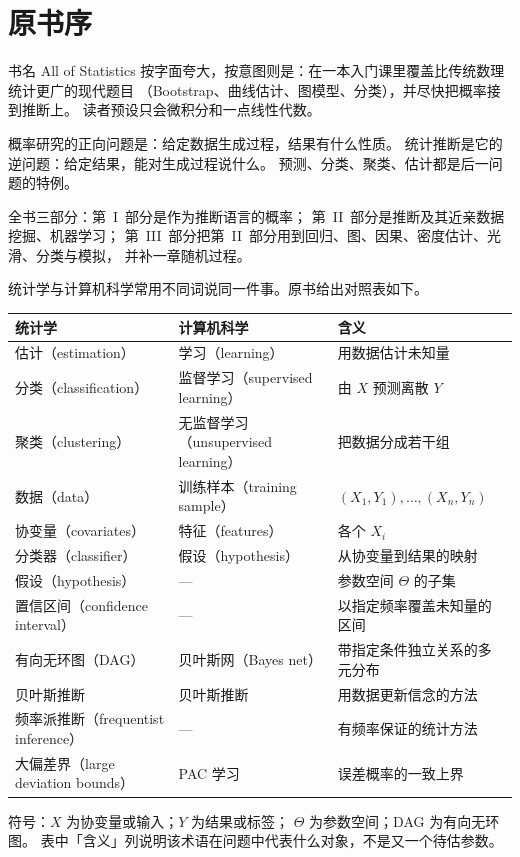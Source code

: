 \chapter*{原书序}

书名 All of Statistics 按字面夸大，按意图则是：在一本入门课里覆盖比传统数理统计更广的现代题目
（Bootstrap、曲线估计、图模型、分类），并尽快把概率接到推断上。
读者预设只会微积分和一点线性代数。

概率研究的正向问题是：给定数据生成过程，结果有什么性质。
统计推断是它的逆问题：给定结果，能对生成过程说什么。
预测、分类、聚类、估计都是后一问题的特例。


全书三部分：第~I~部分是作为推断语言的概率；
第~II~部分是推断及其近亲数据挖掘、机器学习；
第~III~部分把第~II~部分用到回归、图、因果、密度估计、光滑、分类与模拟，
并补一章随机过程。

统计学与计算机科学常用不同词说同一件事。原书给出对照表如下。

\begin{table}[htbp]
\centering
\small
\begin{tabularx}{\linewidth}{>{\raggedright\arraybackslash}p{3.6cm}>{\raggedright\arraybackslash}p{4.2cm}X}
\toprule
统计学 & 计算机科学 & 含义\\
\midrule
估计（estimation） & 学习（learning） &
用数据估计未知量\\
分类（classification） & 监督学习（supervised learning） &
由 $X$ 预测离散 $Y$\\
聚类（clustering） & 无监督学习（unsupervised learning） &
把数据分成若干组\\
数据（data） & 训练样本（training sample） &
$(X_1,Y_1),\ldots,(X_n,Y_n)$\\
协变量（covariates） & 特征（features） &
各个 $X_i$\\
分类器（classifier） & 假设（hypothesis） &
从协变量到结果的映射\\
假设（hypothesis） & --- &
参数空间 $\Theta$ 的子集\\
置信区间（confidence interval） & --- &
以指定频率覆盖未知量的区间\\
有向无环图（DAG） & 贝叶斯网（Bayes net） &
带指定条件独立关系的多元分布\\
贝叶斯推断 & 贝叶斯推断 &
用数据更新信念的方法\\
频率派推断（frequentist inference） & --- &
有频率保证的统计方法\\
大偏差界（large deviation bounds） & PAC 学习 &
误差概率的一致上界\\
\bottomrule
\end{tabularx}
\end{table}

\noindent 符号：$X$ 为协变量或输入；$Y$ 为结果或标签；
$\Theta$ 为参数空间；DAG 为有向无环图。
表中「含义」列说明该术语在问题中代表什么对象，不是又一个待估参数。
